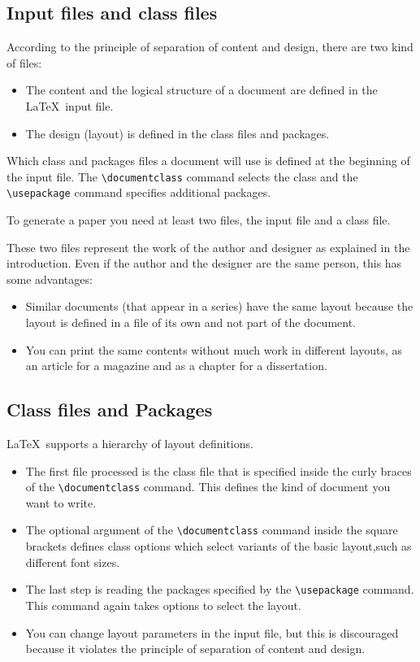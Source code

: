 \documentclass[twoside,a4paper]{refart}
\begin{document}
\subsection{Input files and class files}

According to the principle of separation of content and design, 
there are two kind of files:

\begin{itemize}
\item
        The content and the logical structure of a document are defined in 
        the \LaTeX\ input file.
\item
        The design (layout) is defined in the class files and packages.
\end{itemize}
Which class and packages files a document will use is defined at the 
beginning of the input file.  The \verb|\documentclass| command 
selects the class and the \verb+\usepackage+ command specifies 
additional packages.

To generate a paper you need at least two files, the input file and a 
class file.

These two files represent the work of the author and designer as 
explained in the introduction. Even if the author and the designer are 
the same person, this has some advantages:

\begin{itemize}
\item
        Similar documents (that appear in a series) have the same layout 
        because the layout is defined in a file of its own and not part of 
        the document.
\item
        You can print the same contents without much work in different 
        layouts, as an article for a magazine and as a chapter for a 
        dissertation.
\end{itemize}

\subsection{Class files and Packages}

\LaTeX\ supports a hierarchy of layout definitions.
\begin{itemize}
\item
        The first file processed is the class file that is specified inside 
        the curly braces of the \verb|\documentclass| command. This 
        defines the kind of document you want to write. 
\item
        The optional argument of the \verb|\documentclass| command inside 
        the square brackets defines class options which select variants of 
        the basic layout,such as different font sizes.
\item
        The last step is reading the packages specified by the 
        \verb|\usepackage| command. This command again takes options to 
        select the layout.
\item
        You can change layout parameters in the input file, but this is 
        discouraged because it violates the principle of separation of 
        content and design.

\end{itemize}
\end{document}

